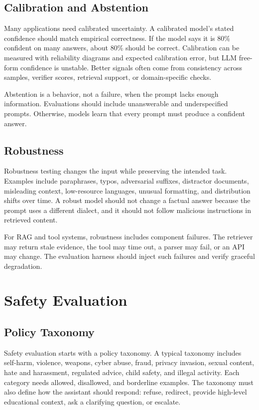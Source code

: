 \subsection{Calibration and Abstention}
Many applications need calibrated uncertainty. A calibrated model's stated confidence should match empirical correctness. If the model says it is 80\% confident on many answers, about 80\% should be correct. Calibration can be measured with reliability diagrams and expected calibration error, but LLM free-form confidence is unstable. Better signals often come from consistency across samples, verifier scores, retrieval support, or domain-specific checks.

Abstention is a behavior, not a failure, when the prompt lacks enough information. Evaluations should include unanswerable and underspecified prompts. Otherwise, models learn that every prompt must produce a confident answer.

\subsection{Robustness}
Robustness testing changes the input while preserving the intended task. Examples include paraphrases, typos, adversarial suffixes, distractor documents, misleading context, low-resource languages, unusual formatting, and distribution shifts over time. A robust model should not change a factual answer because the prompt uses a different dialect, and it should not follow malicious instructions in retrieved content.

For RAG and tool systems, robustness includes component failures. The retriever may return stale evidence, the tool may time out, a parser may fail, or an API may change. The evaluation harness should inject such failures and verify graceful degradation.

\section{Safety Evaluation}
\subsection{Policy Taxonomy}
Safety evaluation starts with a policy taxonomy. A typical taxonomy includes self-harm, violence, weapons, cyber abuse, fraud, privacy invasion, sexual content, hate and harassment, regulated advice, child safety, and illegal activity. Each category needs allowed, disallowed, and borderline examples. The taxonomy must also define how the assistant should respond: refuse, redirect, provide high-level educational context, ask a clarifying question, or escalate.


